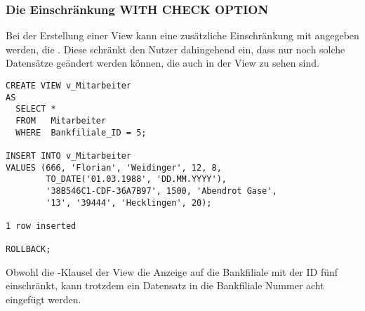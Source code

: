         \subsubsection{Die Einschränkung WITH CHECK OPTION}
          \label{CHECK}
          Bei der Erstellung einer View kann eine zusätzliche Einschränkung mit angegeben werden, die . Diese schränkt den Nutzer dahingehend ein, dass nur noch solche Datensätze geändert werden können, die auch in der View zu sehen sind.
          \begin{lstlisting}[language=oracle_sql,caption={Ein Experiment mit den CHECK OPTION},label=sql08_35]
CREATE VIEW v_Mitarbeiter
AS
  SELECT *
  FROM   Mitarbeiter
  WHERE  Bankfiliale_ID = 5;

INSERT INTO v_Mitarbeiter
VALUES (666, 'Florian', 'Weidinger', 12, 8,
        TO_DATE('01.03.1988', 'DD.MM.YYYY'),
        '38B546C1-CDF-36A7B97', 1500, 'Abendrot Gase',
        '13', '39444', 'Hecklingen', 20);

1 row inserted

ROLLBACK;
          \end{lstlisting}
          Obwohl die \WHERE-Klausel der View  die Anzeige auf die Bankfiliale mit der ID fünf einschränkt, kann trotzdem ein Datensatz in die Bankfiliale Nummer acht eingefügt werden.

